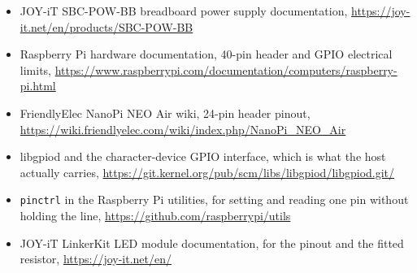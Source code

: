 \begin{itemize}
\item JOY-iT SBC-POW-BB breadboard power supply documentation, \url{https://joy-it.net/en/products/SBC-POW-BB}
\item Raspberry Pi hardware documentation, 40-pin header and GPIO electrical limits, \url{https://www.raspberrypi.com/documentation/computers/raspberry-pi.html}
\item FriendlyElec NanoPi NEO Air wiki, 24-pin header pinout, \url{https://wiki.friendlyelec.com/wiki/index.php/NanoPi_NEO_Air}
\item libgpiod and the character-device GPIO interface, which is what the host actually carries, \url{https://git.kernel.org/pub/scm/libs/libgpiod/libgpiod.git/}
\item \texttt{pinctrl} in the Raspberry Pi utilities, for setting and reading one pin without holding the line, \url{https://github.com/raspberrypi/utils}
\item JOY-iT LinkerKit LED module documentation, for the pinout and the fitted resistor, \url{https://joy-it.net/en/}
\end{itemize}
